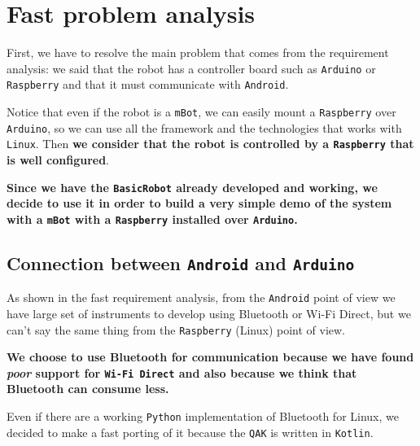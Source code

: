 \section{Fast problem analysis}

First, we have to resolve the main problem that comes from the requirement analysis: we said that the robot has a controller board such as \texttt{Arduino} or \texttt{Raspberry} and that it must communicate with \texttt{Android}. 

Notice that even if the robot is a \texttt{mBot}, we can easily mount a \texttt{Raspberry} over \texttt{Arduino}, so we can use all the framework and the technologies that works with \texttt{Linux}.
Then \textbf{we consider that the robot is controlled by a \texttt{Raspberry} that is well configured}.

\begin{tcolorbox}
	\begin{center}
		\textbf{Since we have the \texttt{BasicRobot} already developed and working, we decide to use it in order to build a very simple demo of the system with a \texttt{mBot} with a \texttt{Raspberry} installed over \texttt{Arduino}.}
	\end{center}
\end{tcolorbox}

\subsection{Connection between \texttt{Android} and \texttt{Arduino}}

As shown in the fast requirement analysis, from the \texttt{Android} point of view we have large set of instruments to develop using Bluetooth or Wi-Fi Direct, but we can't say the same thing from the \texttt{Raspberry} (Linux) point of view.

\begin{tcolorbox}
	\begin{center}
		\textbf{We choose to use Bluetooth for communication because we have found \textit{poor} support for \texttt{Wi-Fi Direct} and also because we think that Bluetooth can consume less.}
	\end{center}
\end{tcolorbox}

Even if there are a working \texttt{Python} implementation of Bluetooth for Linux, we decided to make a fast porting of it because the \texttt{QAK} is written in \texttt{Kotlin}.

